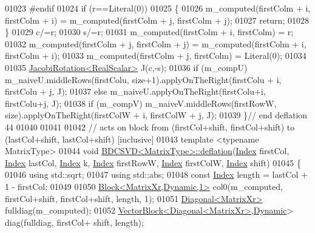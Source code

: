 \begin{DoxyCode}
01023 \textcolor{preprocessor}{#endif}
01024   \textcolor{keywordflow}{if} (r==Literal(0))
01025   \{
01026     m\_computed(firstColm + i, firstColm + i) = m\_computed(firstColm + j, firstColm + j);
01027     \textcolor{keywordflow}{return};
01028   \}
01029   c/=r;
01030   s/=r;
01031   m\_computed(firstColm + i, firstColm) = r;  
01032   m\_computed(firstColm + j, firstColm + j) = m\_computed(firstColm + i, firstColm + i);
01033   m\_computed(firstColm + j, firstColm) = Literal(0);
01034 
01035   \hyperlink{group___jacobi___module_class_eigen_1_1_jacobi_rotation}{JacobiRotation<RealScalar>} J(c,-s);
01036   \textcolor{keywordflow}{if} (m\_compU)  m\_naiveU.middleRows(firstColu, size+1).applyOnTheRight(firstColu + i, firstColu + j, J);
01037   \textcolor{keywordflow}{else}          m\_naiveU.applyOnTheRight(firstColu+i, firstColu+j, J);
01038   \textcolor{keywordflow}{if} (m\_compV)  m\_naiveV.middleRows(firstRowW, size).applyOnTheRight(firstColW + i, firstColW + j, J);
01039 \}\textcolor{comment}{// end deflation 44}
01040 
01041 
01042 \textcolor{comment}{// acts on block from (firstCol+shift, firstCol+shift) to (lastCol+shift, lastCol+shift) [inclusive]}
01043 \textcolor{keyword}{template} <\textcolor{keyword}{typename} MatrixType>
01044 \textcolor{keywordtype}{void} \hyperlink{group___s_v_d___module_class_eigen_1_1_b_d_c_s_v_d}{BDCSVD<MatrixType>::deflation}(\hyperlink{namespace_eigen_a62e77e0933482dafde8fe197d9a2cfde}{Index} firstCol, 
      \hyperlink{namespace_eigen_a62e77e0933482dafde8fe197d9a2cfde}{Index} lastCol, \hyperlink{namespace_eigen_a62e77e0933482dafde8fe197d9a2cfde}{Index} k, \hyperlink{namespace_eigen_a62e77e0933482dafde8fe197d9a2cfde}{Index} firstRowW, \hyperlink{namespace_eigen_a62e77e0933482dafde8fe197d9a2cfde}{Index} firstColW, 
      \hyperlink{namespace_eigen_a62e77e0933482dafde8fe197d9a2cfde}{Index} shift)
01045 \{
01046   \textcolor{keyword}{using} std::sqrt;
01047   \textcolor{keyword}{using} std::abs;
01048   \textcolor{keyword}{const} \hyperlink{namespace_eigen_a62e77e0933482dafde8fe197d9a2cfde}{Index} length = lastCol + 1 - firstCol;
01049   
01050   \hyperlink{group___core___module_class_eigen_1_1_block}{Block<MatrixXr,Dynamic,1>} col0(m\_computed, firstCol+shift, firstCol+shift, 
      length, 1);
01051   \hyperlink{group___core___module_class_eigen_1_1_diagonal}{Diagonal<MatrixXr>} fulldiag(m\_computed);
01052   \hyperlink{group___core___module_class_eigen_1_1_vector_block}{VectorBlock<Diagonal<MatrixXr>},\hyperlink{namespace_eigen_ad81fa7195215a0ce30017dfac309f0b2}{Dynamic}> diag(fulldiag, firstCol+
      shift, length);

\end{DoxyCode}
